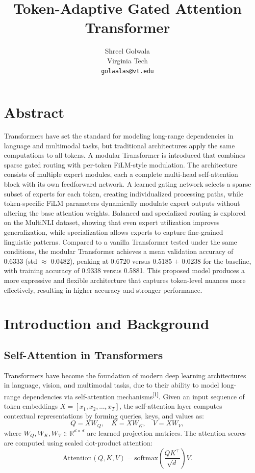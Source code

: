 \documentclass{article}
\title{Token-Adaptive Gated Attention Transformer}
\author{
  Shreel Golwala \\
  Virginia Tech \\
  \texttt{golwalas@vt.edu}
}
\date{}
\begin{document}
\maketitle
\section{Abstract}
\noindent
Transformers have set the standard for modeling long-range dependencies in language and multimodal tasks, but traditional architectures apply the same computations to all tokens. A modular Transformer is introduced that combines sparse gated routing with per-token FiLM-style modulation. The architecture consists of multiple expert modules, each a complete multi-head self-attention block with its own feedforward network. A learned gating network selects a sparse subset of experts for each token, creating individualized processing paths, while token-specific FiLM parameters dynamically modulate expert outputs without altering the base attention weights. Balanced and specialized routing is explored on the MultiNLI dataset, showing that even expert utilization improves generalization, while specialization allows experts to capture fine-grained linguistic patterns. Compared to a vanilla Transformer tested under the same conditions, the modular Transformer achieves a mean validation accuracy of 0.6333 (std $\approx$ 0.0482), peaking at 0.6720 versus 0.5185 $\pm$ 0.0238 for the baseline, with training accuracy of 0.9338 versus 0.5881. This proposed model produces a more expressive and flexible architecture that captures token-level nuances more effectively, resulting in higher accuracy and stronger performance.


\section{Introduction and Background}

\subsection{Self-Attention in Transformers}
Transformers have become the foundation of modern deep learning architectures in language, vision, and multimodal tasks, due to their ability to model long-range dependencies via self-attention mechanisms\textsuperscript{[1]}. Given an input sequence of token embeddings $X = [x_1, x_2, \ldots, x_T]$, the self-attention layer computes contextual representations by forming queries, keys, and values as:
\[
Q = X W_Q, \quad K = X W_K, \quad V = X W_V,
\]
where $W_Q, W_K, W_V \in \mathbb{R}^{d \times d}$ are learned projection matrices. The attention scores are computed using scaled dot-product attention:
\[
\text{Attention}(Q, K, V) = \text{softmax} \left( \frac{Q K^\top}{\sqrt{d}} \right) V.
\]
\end{document}
